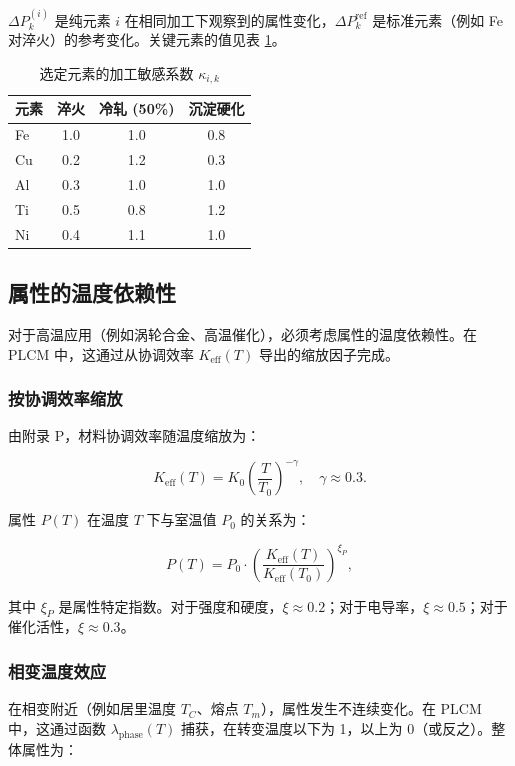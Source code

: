 \documentclass[12pt,a4paper]{article}
\newcommand{\Keff}{K_{\mathrm{eff}}}
\begin{document}
	\(\Delta P_k^{(i)}\) 是纯元素 \(i\) 在相同加工下观察到的属性变化，\(\Delta P_k^{\text{ref}}\) 是标准元素（例如 Fe 对淬火）的参考变化。关键元素的值见表 \ref{tab:kappa-proc}。
	
	\begin{table}[htbp]
		\centering
		\caption{选定元素的加工敏感系数 \(\kappa_{i,k}\)}
		\label{tab:kappa-proc}
		\begin{tabular}{lccc}
			\toprule
			元素 & 淬火 & 冷轧 (50\%) & 沉淀硬化 \\
			\midrule
			Fe & 1.0 & 1.0 & 0.8 \\
			Cu & 0.2 & 1.2 & 0.3 \\
			Al & 0.3 & 1.0 & 1.0 \\
			Ti & 0.5 & 0.8 & 1.2 \\
			Ni & 0.4 & 1.1 & 1.0 \\
			\bottomrule
		\end{tabular}
	\end{table}
	
	\subsection{属性的温度依赖性}
	\label{subsec:temperature-dependence}
	
	对于高温应用（例如涡轮合金、高温催化），必须考虑属性的温度依赖性。在 PLCM 中，这通过从协调效率 \(\Keff(T)\) 导出的缩放因子完成。
	
	\subsubsection{按协调效率缩放}
	由附录 P，材料协调效率随温度缩放为：
	
	\begin{equation}
		\Keff(T) = K_0 \left( \frac{T}{T_0} \right)^{-\gamma}, \quad \gamma \approx 0.3.
		\label{eq:keff-T}
	\end{equation}
	
	属性 \(P(T)\) 在温度 \(T\) 下与室温值 \(P_0\) 的关系为：
	
	\begin{equation}
		P(T) = P_0 \cdot \left( \frac{\Keff(T)}{\Keff(T_0)} \right)^{\xi_P},
		\label{eq:property-T-scaling}
	\end{equation}
	
	其中 \(\xi_P\) 是属性特定指数。对于强度和硬度，\(\xi \approx 0.2\)；对于电导率，\(\xi \approx 0.5\)；对于催化活性，\(\xi \approx 0.3\)。
	
	\subsubsection{相变温度效应}
	在相变附近（例如居里温度 \(T_C\)、熔点 \(T_m\)），属性发生不连续变化。在 PLCM 中，这通过函数 \(\lambda_{\text{phase}}(T)\) 捕获，在转变温度以下为 1，以上为 0（或反之）。整体属性为：
	
\end{document}
